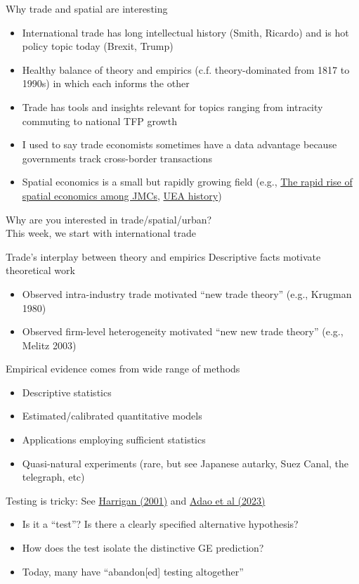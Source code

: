 \documentclass[10pt,notes=hide]{beamer}
\begin{document}
\begin{frame}{Why trade and spatial are interesting}
\begin{itemize}
	\item International trade has long intellectual history (Smith, Ricardo) and is hot policy topic today (Brexit, Trump)
	\item Healthy balance of theory and empirics (c.f. theory-dominated from 1817 to 1990s) in which each informs the other
	\item Trade has tools and insights relevant for topics ranging from intracity commuting to national TFP growth
	\item I used to say trade economists sometimes have a data advantage because governments track cross-border transactions
	\item Spatial economics is a small but rapidly growing field (e.g., \href{https://tradediversion.net/2019/11/11/the-rapid-rise-of-spatial-economics-among-jmcs/}{The rapid rise of spatial economics among JMCs}, \href{https://urbaneconomics.org/about/history.html}{UEA history})
\end{itemize}
\vspace{4mm}
Why are you interested in trade/spatial/urban?
\pause \\ \vspace{2mm}
This week, we start with international trade
\end{frame}
\begin{frame}{Trade's interplay between theory and empirics}
Descriptive facts motivate theoretical work
\begin{itemize}
	\item Observed intra-industry trade motivated ``new trade theory'' (e.g., Krugman 1980)
	\item Observed firm-level heterogeneity motivated ``new new trade theory'' (e.g., Melitz 2003)
\end{itemize}
Empirical evidence comes from wide range of methods
\begin{itemize}
	\item Descriptive statistics
	\item Estimated/calibrated quantitative models
	\item Applications employing sufficient statistics
	\item Quasi-natural experiments (rare, but see Japanese autarky, Suez Canal, the telegraph, etc)
\end{itemize}
Testing is tricky: See \href{https://www.nber.org/papers/w8675}{Harrigan (2001)} and \href{https://www.nber.org/papers/w31321}{Adao et al (2023)}
\begin{itemize}
\item Is it a ``test''? Is there a clearly specified alternative hypothesis?
\item How does the test isolate the distinctive GE prediction?
\item Today, many have ``abandon[ed] testing altogether''
\end{itemize}
\end{frame}
\end{document}
